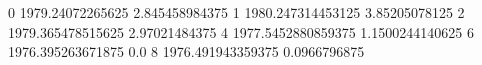 0 1979.24072265625 2.845458984375
1 1980.247314453125 3.85205078125
2 1979.365478515625 2.97021484375
4 1977.5452880859375 1.1500244140625
6 1976.395263671875 0.0
8 1976.491943359375 0.0966796875
